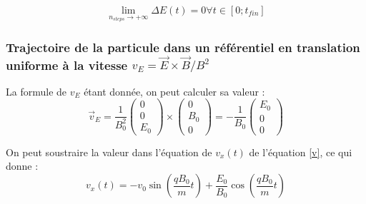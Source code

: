 \documentclass[a4paper,12pt,twoside]{article}
\begin{document}
\begin{equation}\label{cons_en}
\lim_{n_{steps} \rightarrow +\infty} \Delta E(t) = 0 \forall t \in [0;t_{fin}]
\end{equation}

\subsubsection{Trajectoire de la particule dans un r\'ef\'erentiel en translation uniforme \`a la vitesse $v_E = \Vec{E}\times\Vec{B}/B^2$}

\noindent La formule de $v_E$ \'etant donn\'ee, on peut calculer sa valeur : 
\begin{equation}\label{v_e}
\Vec{v}_E = \frac{1}{B_0^2}\begin{pmatrix}0 \\ 0 \\ E_0 \end{pmatrix}\times\begin{pmatrix}0 \\ B_0 \\ 0 \end{pmatrix} = -\frac{1}{B_0}\begin{pmatrix}E_0 \\ 0 \\ 0 \end{pmatrix}
\end{equation}

\noindent On peut soustraire la valeur dans l'\'equation de $v_x(t)$ de l'\'equation \ref{v}, ce qui donne :
\begin{equation}\label{sol v_e}
v_x(t) = - v_0\sin\left(\frac{qB_0}{m}t\right) + \frac{E_0}{B_0}\cos\left(\frac{qB_0}{m}t\right)
\end{equation}
\end{document}
